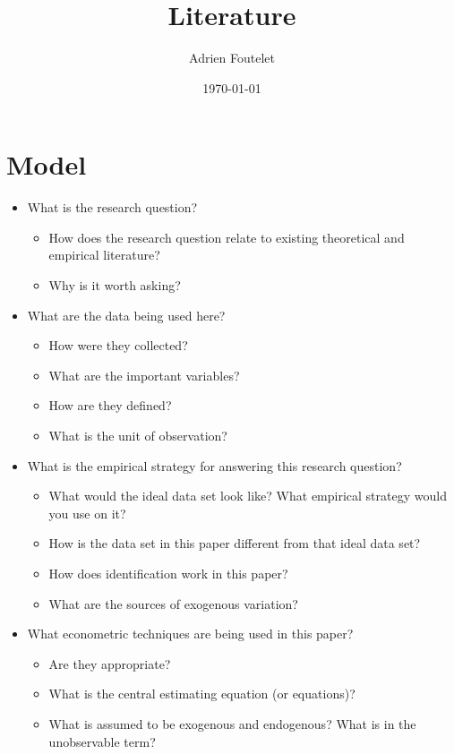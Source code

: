 \documentclass{article}
\title{Literature
}
\author{Adrien Foutelet}
\date{\today}
\begin{document}
\maketitle

\section{Model}

\begin{itemize}
    \item What is the research question?
    \begin{itemize}
        \item How does the research question relate to existing theoretical and empirical literature?
        \item Why is it worth asking?
    \end{itemize}
    \item What are the data being used here?
    \begin{itemize}
        \item How were they collected?
        \item What are the important variables?
        \item How are they defined?
        \item What is the unit of observation?
    \end{itemize}
    \item What is the empirical strategy for answering this research question?
    \begin{itemize}
        \item What would the ideal data set look like? What empirical strategy would you use on it?
        \item How is the data set in this paper different from that ideal data set?
        \item How does identification work in this paper?
        \item What are the sources of exogenous variation?
    \end{itemize}
    \item What econometric techniques are being used in this paper?
    \begin{itemize}
        \item Are they appropriate?
        \item What is the central estimating equation (or equations)?
        \item What is assumed to be exogenous and endogenous? What is in the unobservable term?

\end{itemize}
\end{itemize}
\end{document}
